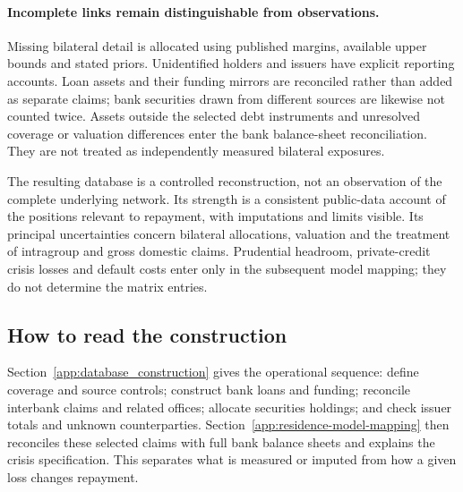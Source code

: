 \paragraph{Incomplete links remain distinguishable from observations.}
Missing bilateral detail is allocated using published margins, available upper bounds and stated priors. Unidentified holders and issuers have explicit reporting accounts. Loan assets and their funding mirrors are reconciled rather than added as separate claims; bank securities drawn from different sources are likewise not counted twice. Assets outside the selected debt instruments and unresolved coverage or valuation differences enter the bank balance-sheet reconciliation. They are not treated as independently measured bilateral exposures.

The resulting database is a controlled reconstruction, not an observation of the complete underlying network. Its strength is a consistent public-data account of the positions relevant to repayment, with imputations and limits visible. Its principal uncertainties concern bilateral allocations, valuation and the treatment of intragroup and gross domestic claims. Prudential headroom, private-credit crisis losses and default costs enter only in the subsequent model mapping; they do not determine the matrix entries.

\subsection{How to read the construction}

Section~\ref{app:database_construction} gives the operational sequence: define coverage and source controls; construct bank loans and funding; reconcile interbank claims and related offices; allocate securities holdings; and check issuer totals and unknown counterparties. Section~\ref{app:residence-model-mapping} then reconciles these selected claims with full bank balance sheets and explains the crisis specification. This separates what is measured or imputed from how a given loss changes repayment.

